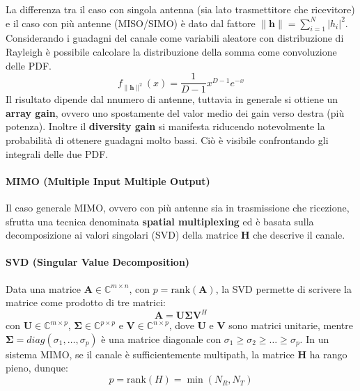 La differenza tra il caso con singola antenna (sia lato trasmettitore che ricevitore) e il caso con più antenne (MISO/SIMO) è dato dal fattore $\| \mathbf{h} \| = \sum_{i=1}^{N} |h_i|^2$.
Considerando i guadagni del canale come variabili aleatore con distribuzione di Rayleigh è possibile calcolare la distribuzione della somma come convoluzione delle PDF.
\[
    f_{\| \mathbf{h} \|^2} (x) = \frac{1}{D-1} x^{D-1} e^{-x}
\]
Il risultato dipende dal nnumero di antenne, tuttavia in generale si ottiene un \textbf{array gain}, ovvero uno spostamente del valor medio dei gain verso destra (più potenza).
Inoltre il \textbf{diversity gain} si manifesta riducendo notevolmente la probabilità di ottenere guadagni molto bassi.
Ciò è visibile confrontando gli integrali delle due PDF.

\paragraph*{MIMO (Multiple Input Multiple Output)}

Il caso generale MIMO, ovvero con più antenne sia in trasmissione che ricezione, sfrutta una tecnica denominata \textbf{spatial multiplexing} ed è basata sulla decomposizione ai valori singolari (SVD) della matrice $\mathbf{H}$ che descrive il canale.

\paragraph*{SVD (Singular Value Decomposition)}

Data una matrice $\mathbf{A} \in \mathbb{C}^{m \times n}$, con  $p = \text{rank} (\mathbf{A})$, la SVD permette di scrivere la matrice come prodotto di tre matrici:
\[
    \mathbf{A} = \mathbf{U} \mathbf{\Sigma} \mathbf{V}^H
\]
con $\mathbf{U} \in \mathbb{C}^{m \times p}$, $\mathbf{\Sigma} \in \mathbb{C}^{p \times p}$ e $\mathbf{V} \in \mathbb{C}^{n \times p}$,
dove $\mathbf{U}$ e $\mathbf{V}$ sono matrici unitarie, mentre $\mathbf{\Sigma} = diag(\sigma_1, \ldots, \sigma_p)$ è una matrice diagonale con $\sigma_1 \geq \sigma_2 \geq \ldots \geq \sigma_p$. In un sistema MIMO, se il canale è sufficientemente multipath, la matrice $\mathbf{H}$ ha rango pieno, dunque:
\[
    p = \text{rank}(H) = \min(N_R, N_T)
\]

